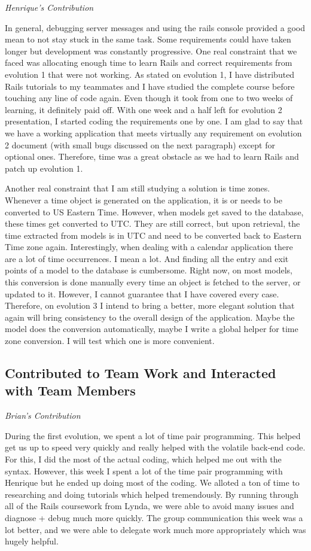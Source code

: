 \documentclass[11pt]{article}
\begin{document}
\textit{Henrique's Contribution}

In general, debugging server messages and using the rails console provided a good mean to not stay stuck in the same task. Some requirements could have taken longer but development was constantly progressive. One real constraint that we faced was allocating enough time to learn Rails and correct requirements from evolution 1 that were not working. As stated on evolution 1, I have distributed Rails tutorials to my teammates and I have studied the complete course before touching any line of code again. Even though it took from one to two weeks of learning, it definitely paid off. With one week and a half left for evolution 2 presentation, I started coding the requirements one by one. I am glad to say  that we have a working application that meets virtually any requirement on evolution 2 document (with small bugs discussed on the next paragraph) except for optional ones. Therefore, time was a great obstacle as we had to learn Rails and patch up evolution 1.

Another real constraint that I am still studying a solution is time zones. Whenever a time object is generated on the application, it is or needs to be converted to US Eastern Time. However, when models get saved to the database, these times get converted to UTC. They are still correct, but upon retrieval, the time extracted from models is in UTC and need to be converted back to Eastern Time zone again. Interestingly, when dealing with a calendar application there are a lot of time occurrences. I mean a lot. And finding all the entry and exit points of a model to the database is cumbersome. Right now, on most models, this conversion is done manually every time an object is fetched to the server, or updated to it. However, I cannot guarantee that I have covered every case. Therefore, on evolution 3 I intend to bring a better, more elegant solution that again will bring consistency to the overall design of the application. Maybe the model does the conversion automatically, maybe I write a global helper for time zone conversion. I will test which one is more convenient.

\subsection{Contributed to Team Work and Interacted with Team Members}

\textit{Brian's Contribution}

During the first evolution, we spent a lot of time pair programming. This helped get us up to speed very quickly and really helped with the volatile back-end code. For this, I did the most of the actual coding, which helped me out with the syntax. However, this week I spent a lot of the time pair programming with Henrique but he ended up doing most of the coding. We alloted a ton of time to researching and doing tutorials which helped tremendously. By running through all of the Rails coursework from Lynda, we were able to avoid many issues and diagnose + debug much more quickly. The group communication this week was a lot better, and we were able to delegate work much more appropriately which was hugely helpful. 
\end{document}
